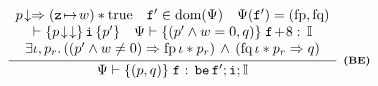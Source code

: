 \begin{figure*}[!thp]
{\begin{minipage}{1\linewidth}
			{\color{blue}
			\[
				\infer[\tinybftext{(BE)}]
				{
					\wfcblk{\astP}{\astQ}{\lab{}}
						{\be \, \lab{}'; \simplins{}; \cblk}
				}
				{
					\begin{array}{c}
						\nxtAst{\astP} \Rightarrow
						(\regst{\regz}{\word}) \sepstar \atrue
						\quad
						\lab{}' \in \dom(\Cspec{})
						\quad
						\Cspec(\lab{}') = (\specpre, \specpost) \\
						\wfins{\nxtAst{\nxtAst{\astP}}}{\simplins{}}{\astP'}
						\quad
						\wfcblk{\astP'\land\word=0}{\astQ}{\lab{}\!+\!8}{\cblk} \\
						\exists \lgvl, \astP_r. \,
						((\astP' \land \word \neq 0) \Rightarrow
							\specpre \, \lgvl \sepstar \astP_r) \, \land \,
						(\specpost \, \lgvl \sepstar \astP_r \Rightarrow \astQ)
					\end{array}
				}
			\]
			}
%
%
%

\end{minipage}}
\end{figure*}
